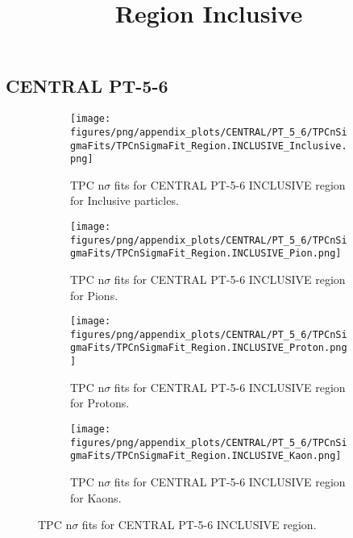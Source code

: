             \subsection{CENTRAL PT-5-6}
            \begin{figure}[H]
                \title{Region Inclusive}
                \begin{subfigure}[b]{0.5\textwidth}
                    \centering
                    \texttt{[image: figures/png/appendix\_plots/CENTRAL/PT\_5\_6/TPCnSigmaFits/TPCnSigmaFit\_Region.INCLUSIVE\_Inclusive.png]}
                    \caption{TPC n$\sigma$ fits for CENTRAL PT-5-6 INCLUSIVE region for Inclusive particles.}
                    \label{fig:appendix_CENTRAL_PT-5-6_INCLUSIVE_Inclusive}
                \end{subfigure}
                \begin{subfigure}[b]{0.5\textwidth}
                    \centering
                    \texttt{[image: figures/png/appendix\_plots/CENTRAL/PT\_5\_6/TPCnSigmaFits/TPCnSigmaFit\_Region.INCLUSIVE\_Pion.png]}
                    \caption{TPC n$\sigma$ fits for CENTRAL PT-5-6 INCLUSIVE region for Pions.}
                    \label{fig:appendix_CENTRAL_PT-5-6_INCLUSIVE_Pion}
                \end{subfigure}
                \begin{subfigure}[b]{0.5\textwidth}
                    \centering
                    \texttt{[image: figures/png/appendix\_plots/CENTRAL/PT\_5\_6/TPCnSigmaFits/TPCnSigmaFit\_Region.INCLUSIVE\_Proton.png]}
                    \caption{TPC n$\sigma$ fits for CENTRAL PT-5-6 INCLUSIVE region for Protons.}
                    \label{fig:appendix_CENTRAL_PT-5-6_INCLUSIVE_Proton}
                \end{subfigure}
                \begin{subfigure}[b]{0.5\textwidth}
                    \centering
                    \texttt{[image: figures/png/appendix\_plots/CENTRAL/PT\_5\_6/TPCnSigmaFits/TPCnSigmaFit\_Region.INCLUSIVE\_Kaon.png]}
                    \caption{TPC n$\sigma$ fits for CENTRAL PT-5-6 INCLUSIVE region for Kaons.}
                    \label{fig:appendix_CENTRAL_PT-5-6_INCLUSIVE_Kaon}
                \end{subfigure}
                \caption{TPC n$\sigma$ fits for CENTRAL PT-5-6 INCLUSIVE region.}
                \label{fig:appendix_CENTRAL_PT-5-6_INCLUSIVE}
            \end{figure}
